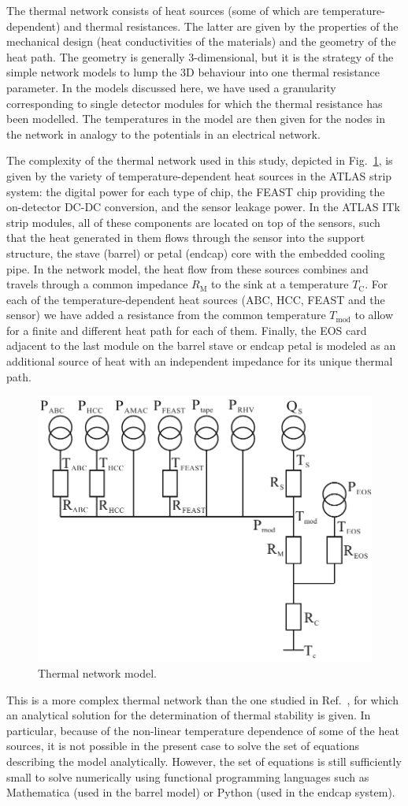 The thermal network consists of heat sources (some of which are temperature-dependent) and thermal resistances. The latter are given by the properties of the mechanical design (heat conductivities of the materials) and the geometry of the heat path. The geometry is generally 3-dimensional, but it is the strategy of the simple network models to lump the 3D behaviour into one thermal resistance parameter. In the models discussed here, we have used a granularity corresponding to single detector modules for which the thermal resistance has been modelled. The temperatures in the model are then given for the nodes in the network in analogy to the potentials in an electrical network.

The complexity of the thermal network used in this study, depicted in Fig.~\ref{fig:thermalmodel}, is given by the variety of temperature-dependent heat sources in the ATLAS strip system: the digital power for each type of chip, the FEAST chip providing the on-detector DC-DC conversion, and the sensor leakage power. In the ATLAS ITk strip modules, all of these components are located on top of the sensors, such that the heat generated in them flows through the sensor into the support structure, the stave (barrel) or petal (endcap) core with the embedded cooling pipe. In the network model, the heat flow from these sources combines and travels through a common impedance $R_\text{M}$ to the sink at a temperature $T_\text{C}$. For each of the temperature-dependent heat sources (ABC, HCC, FEAST and the sensor) we have added a resistance from the common temperature $T_\text{mod}$ to allow for a finite and different heat path for each of them. Finally, the EOS card adjacent to the last module on the barrel stave or endcap petal is modeled as an additional source of heat with an independent impedance for its unique thermal path.

\begin{figure}[ht]
\centering
\includegraphics[width=0.6\linewidth]{figures/Thermalmodel.pdf}
\caption{Thermal network model.}
\label{fig:thermalmodel}
\end{figure}

This is a more complex thermal network than the one studied in Ref.~\cite{Beck:2010zzd}, for which an analytical solution for the determination of thermal stability is given. In particular, because of the non-linear temperature dependence of some of the heat sources, it is not possible in the present case to solve the set of equations describing the model analytically. However, the set of equations is still sufficiently small to solve numerically using functional programming languages such as Mathematica (used in the barrel model) or Python (used in the endcap system).
